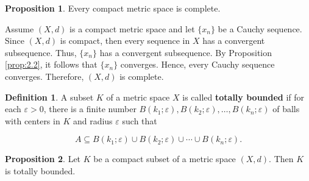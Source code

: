 \documentclass{article}
\makeatletter
\theoremstyle{definition}
\newtheorem{prop}{Proposition}[section]
\newtheorem{definition}{Definition}[section]
\theoremstyle{remark}
\let\oldproofname=\proofname
\renewcommand{\proofname}{\bf{\textit{\oldproofname}}}
\theoremstyle{definition}
\renewenvironment{proof}[1][\proofname]{\par
  \pushQED{\qed}%
  \normalfont \topsep6\p@\@plus6\p@\relax
  \list{}{\leftmargin=0mm
          \rightmargin=0mm
          \settowidth{\itemindent}{\itshape#1}%
          \labelwidth=\itemindent
          \parsep=0pt \listparindent=0mm%
  }
  \item[\hskip\labelsep
        \itshape
    #1\@addpunct{.}]\ignorespaces
}{%
  \popQED\endlist\@endpefalse
}
\makeatother
\begin{document}
\begin{prop}\label{prop:2.3}
    Every compact metric space is complete.
\end{prop}

\begin{proof}
    Assume $(X,d)$ is a compact metric space and let $\{x_n\}$ be a Cauchy sequence. Since $(X,d)$ is compact, then every sequence in $X$ has a convergent subsequence. Thus, $\{x_n\}$ has a convergent subsequence. By Proposition \ref{prop:2.2}, it follows that $\{x_n\}$ converges. Hence, every Cauchy sequence converges. Therefore, $(X,d)$ is complete.
\end{proof}

\begin{definition}\label{df:2.1}
    A subset $K$ of a metric space $X$ is called \textbf{totally bounded} if for each $\varepsilon>0$, there is a finite number $B(k_1;\varepsilon), B(k_2;\varepsilon),\dots,B(k_n;\varepsilon)$ of balls with centers in $K$ and radius $\varepsilon$ such that 
    
    \begin{equation*}
        A\subseteq B(k_1;\varepsilon)\cup B(k_2;\varepsilon)\cup\cdots\cup B(k_n;\varepsilon).
    \end{equation*}
\end{definition}

\begin{prop}\label{prop:2.4}
    Let $K$ be a compact subset of a metric space $(X,d)$. Then $K$ is totally bounded.
\end{prop}
\end{document}
